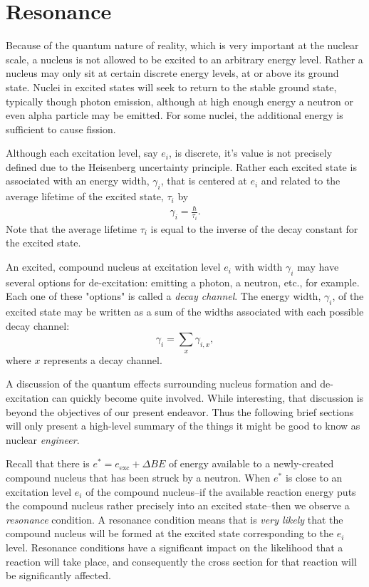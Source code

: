 \documentclass[11pt]{article}
\begin{document}
\section{Resonance}
\label{sec:orgheadline5}
Because of the quantum nature of reality, which is very important at the nuclear scale, a nucleus is not allowed to be excited to an arbitrary energy level.  Rather a nucleus may only sit at certain discrete energy levels, at or above its ground state.  Nuclei in excited states will seek to return to the stable ground state, typically though photon emission, although at high enough energy a neutron or even alpha particle may be emitted.  For some nuclei, the additional energy is sufficient to cause fission.  

Although each excitation level, say \(e_i\), is discrete, it's value is not precisely defined due to the Heisenberg uncertainty principle.  Rather each excited state is associated with an energy width, \(\gamma_i\), that is centered at \(e_i\) and related to the average lifetime of the excited state, \(\tau_i\) by
\begin{align}
  \gamma_i = \frac{\hbar}{\tau_i}.
\end{align}
Note that the average lifetime \(\tau_i\) is equal to the inverse of the decay constant for the excited state.

An excited, compound nucleus at excitation level \(e_i\) with width \(\gamma_i\) may have several options for de-excitation: emitting a photon, a neutron, etc., for example.  Each one of these "options" is called a \emph{decay channel}.  The energy width, \(\gamma_i\), of the excited state may be written as a sum of the widths associated with each possible decay channel:
\begin{equation}
  \gamma_i = \sum_x \gamma_{i,x},
\end{equation}
where \(x\) represents a decay channel.

A discussion of the quantum effects surrounding nucleus formation and de-excitation can quickly become quite involved.  While interesting, that discussion is beyond the objectives of our present endeavor.  Thus the following brief sections will only present a high-level summary of the things it might be good to know as nuclear \emph{engineer}.

Recall that there is \(e^* = e_{\text{exc}} + \Delta BE\) of energy available to a newly-created compound nucleus that has been struck by a neutron.  When \(e^*\) is close to an excitation level \(e_i\) of the compound nucleus--if the available reaction energy puts the compound nucleus rather precisely into an excited state--then we observe a \emph{resonance} condition.  A resonance condition means that is \emph{very likely} that the compound nucleus will be formed at the excited state corresponding to the \(e_i\) level.  Resonance conditions have a significant impact on the likelihood that a reaction will take place, and consequently the cross section for that reaction will be significantly affected.
\end{document}
